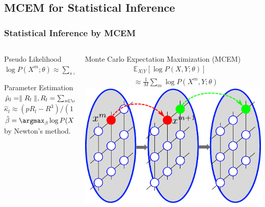 \documentclass[sansserif, 10pt]{beamer}
\begin{document}
\subsection{MCEM for Statistical Inference}
\begin{frame}
\frametitle{Statistical Inference by MCEM}

\begin{columns}[t]
  \begin{column}{0.6\textwidth}

     {
      \begin{block}{Pseudo Likelihood}
        $ \log P(X^m; \theta) \approx \sum_{s\in \mathcal{V}} \log P(x_s | x_{\mathcal{N}_s};\theta)$
      \end{block}
    }
     {
      \begin{block}{Parameter Estimation}
        $\hat \mu_l = \parallel R_l\parallel, R_l = \sum_{s \in \cV_l}^{} y_s $ \\
        $\hat \kappa_l \approx (pR_l - R^3) / (1 - R^2) $\\
        $\hat \beta = \argmax_\beta \log P(X; \theta)$ by Newton's method. 
      \end{block}
    }

    \end{column}

  \begin{column}{0.4\textwidth}

    {
      \begin{block}{Monte Carlo Expectation Maximization (MCEM)}
        \begin{align*}
          & \mathbb{E}_{X|Y} [\log P(X,Y;\theta)] \\
          &\approx \frac{1}{M}\sum_m \log P(X^m, Y; \theta)
        \end{align*}
        \includegraphics[width=1\textwidth]{sfig/imagechain_mcmc}
      \end{block}
    }
  \end{column}
\end{columns}
\end{frame}
\end{document}
